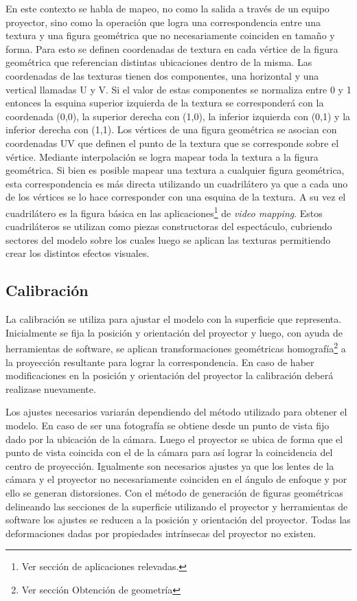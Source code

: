 En este contexto se habla de mapeo, no como la salida a través de un equipo proyector, sino como la operación que logra una correspondencia entre una textura y una figura geométrica que no necesariamente coinciden en tamaño y forma. Para esto se definen coordenadas de textura en cada vértice de la figura geométrica que referencian distintas ubicaciones dentro de la misma.
Las coordenadas de las texturas tienen dos componentes, una horizontal y una vertical llamadas U y V. Si el valor de estas componentes se normaliza entre 0 y 1 entonces la esquina superior izquierda de la textura se corresponderá con la coordenada (0,0), la superior derecha con (1,0), la inferior izquierda con (0,1) y la inferior derecha con (1,1).
Los vértices de una figura geométrica se asocian con coordenadas UV que definen el punto de la textura que se corresponde sobre el vértice. Mediante interpolación se logra mapear toda la textura a la figura geométrica.
Si bien es posible mapear una textura a cualquier figura geométrica, esta correspondencia es más directa utilizando un cuadrilátero ya que a cada uno de los vértices se lo hace corresponder con una esquina de la textura. A su vez el cuadrilátero es la figura básica en las aplicaciones\footnote{Ver sección de aplicaciones relevadas.} de \emph{video mapping}.
Estos cuadriláteros se utilizan como piezas constructoras del espectáculo, cubriendo sectores del modelo sobre los cuales luego se aplican las texturas permitiendo crear los distintos efectos visuales.

\subsection{Calibración}
La calibración se utiliza para ajustar el modelo con la superficie que representa. Inicialmente se fija la posición y orientación del proyector y luego, con ayuda de herramientas de software, se aplican transformaciones geométricas homografía\footnote{Ver sección Obtención de geometría} a la proyección resultante para lograr la correspondencia.
En caso de haber modificaciones en la posición y orientación del proyector la calibración deberá realizase nuevamente.

Los ajustes necesarios variarán dependiendo del método utilizado para obtener el modelo. En caso de ser una fotografía se obtiene desde un punto de vista fijo dado por la ubicación de la cámara. Luego el proyector se ubica de forma que el punto de vista coincida con el de la cámara para así lograr la coincidencia del centro de proyección. Igualmente son necesarios ajustes ya que los lentes de la cámara y el proyector no necesariamente coinciden en el ángulo de enfoque y por ello se generan distorsiones\cite{LibroCompGrafica2}\cite{LibroPhotographicOptics}. Con el método de generación de figuras geométricas delineando las secciones de la superficie utilizando el proyector y herramientas de software los ajustes se reducen a la posición y orientación del proyector. Todas las deformaciones dadas por propiedades intrínsecas del proyector no existen.

